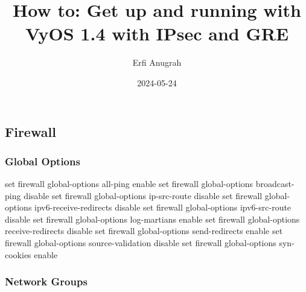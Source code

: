 \documentclass[
]{article}
\title{How to: Get up and running with VyOS 1.4 with IPsec and GRE}
\author{Erfi Anugrah}
\date{2024-05-24}
\newenvironment{Shaded}{\begin{snugshade}}{\end{snugshade}}
\newcommand{\BuiltInTok}[1]{#1}
\newcommand{\NormalTok}[1]{#1}
\newcommand{\StringTok}[1]{\textcolor[rgb]{0.31,0.60,0.02}{#1}}
\renewcommand*\contentsname{Table of contents}
\newcommand\contentsname{Table of contents}
\begin{document}
\maketitle

\renewcommand*\contentsname{Table of contents}
{
\hypersetup{linkcolor=}
\setcounter{tocdepth}{10}
\tableofcontents
}
\newpage{}

\subsection{Firewall}\label{firewall}

\subsubsection{Global Options}\label{global-options}

\begin{Shaded}
\begin{Highlighting}[numbers=left,,]
\BuiltInTok{set}\NormalTok{ firewall global{-}options all{-}ping }\StringTok{\textquotesingle{}enable\textquotesingle{}}
\BuiltInTok{set}\NormalTok{ firewall global{-}options broadcast{-}ping }\StringTok{\textquotesingle{}disable\textquotesingle{}}
\BuiltInTok{set}\NormalTok{ firewall global{-}options ip{-}src{-}route }\StringTok{\textquotesingle{}disable\textquotesingle{}}
\BuiltInTok{set}\NormalTok{ firewall global{-}options ipv6{-}receive{-}redirects }\StringTok{\textquotesingle{}disable\textquotesingle{}}
\BuiltInTok{set}\NormalTok{ firewall global{-}options ipv6{-}src{-}route }\StringTok{\textquotesingle{}disable\textquotesingle{}}
\BuiltInTok{set}\NormalTok{ firewall global{-}options log{-}martians }\StringTok{\textquotesingle{}enable\textquotesingle{}}
\BuiltInTok{set}\NormalTok{ firewall global{-}options receive{-}redirects }\StringTok{\textquotesingle{}disable\textquotesingle{}}
\BuiltInTok{set}\NormalTok{ firewall global{-}options send{-}redirects }\StringTok{\textquotesingle{}enable\textquotesingle{}}
\BuiltInTok{set}\NormalTok{ firewall global{-}options source{-}validation }\StringTok{\textquotesingle{}disable\textquotesingle{}}
\BuiltInTok{set}\NormalTok{ firewall global{-}options syn{-}cookies }\StringTok{\textquotesingle{}enable\textquotesingle{}}
\end{Highlighting}
\end{Shaded}

\newpage{}

\subsubsection{Network Groups}\label{network-groups}
\end{document}
